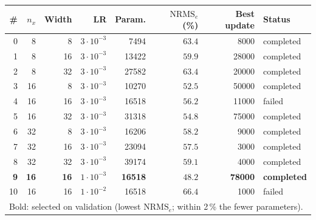 \setlength{\tabcolsep}{4pt}
\begin{tabular}{r r r r r r r l}
\toprule
\# & $n_x$ & Width & LR & Param. & $\mathrm{NRMS}_e$ (\%) & Best update & Status\\
\midrule
0 & 8 & 8 & $3\cdot10^{-3}$ & 7494 & $63.4$ & 8000 & completed\\
1 & 8 & 16 & $3\cdot10^{-3}$ & 13422 & $59.9$ & 28000 & completed\\
2 & 8 & 32 & $3\cdot10^{-3}$ & 27582 & $63.4$ & 20000 & completed\\
3 & 16 & 8 & $3\cdot10^{-3}$ & 10270 & $52.5$ & 50000 & completed\\
4 & 16 & 16 & $3\cdot10^{-3}$ & 16518 & $56.2$ & 11000 & failed\\
5 & 16 & 32 & $3\cdot10^{-3}$ & 31318 & $54.8$ & 75000 & completed\\
6 & 32 & 8 & $3\cdot10^{-3}$ & 16206 & $58.2$ & 9000 & completed\\
7 & 32 & 16 & $3\cdot10^{-3}$ & 23094 & $57.5$ & 3000 & completed\\
8 & 32 & 32 & $3\cdot10^{-3}$ & 39174 & $59.1$ & 4000 & completed\\
\textbf{9} & \textbf{16} & \textbf{16} & \textbf{$1\cdot10^{-3}$} & \textbf{16518} & \textbf{$48.2$} & \textbf{78000} & \textbf{completed}\\
10 & 16 & 16 & $1\cdot10^{-2}$ & 16518 & $66.4$ & 1000 & failed\\
\bottomrule
\multicolumn{8}{l}{\footnotesize Bold: selected on validation (lowest $\mathrm{NRMS}_e$; within 2\,\% the fewer parameters).}\\
\end{tabular}
